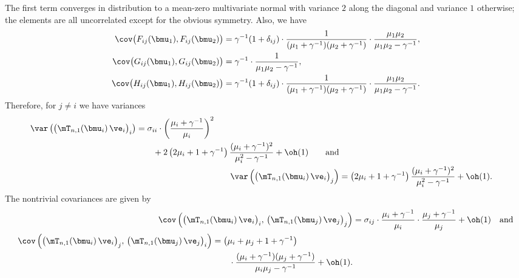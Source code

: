 The first term converges in distribution to a mean-zero multivariate normal
with variance $2$ along the diagonal and variance $1$ otherwise; the elements
are all uncorrelated except for the obvious symmetry.  Also, we have
\begin{align*}
    \cov\big( F_{ij} ( \bmu_1 ), F_{ij} ( \bmu_2 ) \big)
        &= 
        \gamma^{-1} ( 1 + \delta_{ij} )
        \cdot
        \frac{1}{ ( \mu_1 + \gamma^{-1} ) ( \mu_2 + \gamma^{-1} ) }
        \cdot
        \frac{ \mu_1 \mu_2 }{ \mu_1 \mu_2 - \gamma^{-1} }, \\
    \cov\big( G_{ij} ( \bmu_1 ), G_{ij} ( \bmu_2 ) \big)
        &= 
        \gamma^{-1} 
        \cdot
        \frac{1}{ \mu_1 \mu_2 - \gamma^{-1} }, \\
    \cov\big( H_{ij} ( \bmu_1 ), H_{ij} ( \bmu_2 ) \big)
        &= 
        \gamma^{-1} ( 1 + \delta_{ij} )
        \cdot
        \frac{1}{ ( \mu_1 + \gamma^{-1} ) ( \mu_2 + \gamma^{-1} ) }
        \cdot
        \frac{ \mu_1 \mu_2 }{ \mu_1 \mu_2 - \gamma^{-1} }.
\end{align*}
Therefore, for $j \neq i$ we have variances
\begin{align*}
    \begin{split}
    \var \left(
        \big(
            \mT_{n,1}( \bmu_i ) \,
            \ve_i
        \big)_i
    \right)
        &= 
        \sigma_{ii}
        \cdot
        \left(
            \frac{\mu_i + \gamma^{-1}}{\mu_i}
        \right)^2 \\
        &\qquad+
        2
        \left(
            2 \mu_i + 1 + \gamma^{-1}
        \right)
        \frac{ (\mu_i + \gamma^{-1})^2 }
             { \mu_i^2 - \gamma^{-1} } + \oh(1) \qquad\text{and}
    \end{split} \\
    \var \left(
        \big(
            \mT_{n,1}( \bmu_i ) \,
            \ve_i
        \big)_j
    \right)
        &=
        \left(
            2 \mu_i + 1 + \gamma^{-1}
        \right)
        \frac{ (\mu_i + \gamma^{-1})^2 }
             { \mu_i^2 - \gamma^{-1} } + \oh(1).
\end{align*}
The nontrivial covariances are given by
\begin{align*}
    \cov \left( 
        \big(
            \mT_{n,1}( \bmu_i ) \,
            \ve_i
        \big)_i, \,
        \big(
            \mT_{n,1}( \bmu_j ) \,
            \ve_j
        \big)_j
    \right)
        &=
        \sigma_{ij}
        \cdot
        \frac{\mu_i + \gamma^{-1}}{ \mu_i }
        \cdot
        \frac{\mu_j + \gamma^{-1}}{ \mu_j } + \oh(1) \quad\text{and} \\
    \begin{split}
    \cov \left(
        \big(
            \mT_{n,1}( \bmu_i ) \,
            \ve_i
        \big)_j, \,
        \big(
            \mT_{n,1}( \bmu_j ) \,
            \ve_j
        \big)_i    
    \right)
        &=
        \left(
            \mu_i + \mu_j + 1 + \gamma^{-1}
        \right) \\
        &\qquad \cdot
            \frac{ ( \mu_i + \gamma^{-1} )( \mu_j + \gamma^{-1} ) }
                 { \mu_i \mu_j - \gamma^{-1} }
        + \oh(1).
    \end{split}
\end{align*}
